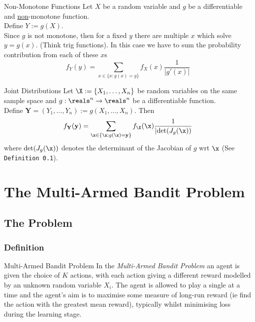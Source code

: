 \documentclass[11pt,a4paper]{article}
\begin{document}
\begin{theorem}{Non-Monotone Functions}
  Let $X$ be a random variable and $g$ be a differentiable and \underline{non}-monotone function.\\
  Define $Y:=g(X)$.\\
  Since $g$ is not monotone, then for a fixed $y$ there are multiple $x$ which solve $y=g(x)$. (Think trig functions). In this case we have to sum the probability contribution from each of these $x$s
  \[ f_Y(y)=\sum_{x\in\{x:g(x)=y\}}f_X(x)\frac{1}{|g'(x)|} \]
\end{theorem}

\begin{theorem}{Joint Distributions}
  Let $\X:=\{X_1,\dots,X_n\}$ be random variables on the same sample space and $g:\reals^n\to\reals^n$ be a differentiable function.\\
  Define $\mathbf{Y}=(Y_1,\dots,Y_n):=g(X_1,\dots,X_n)$. Then
  \[ f_\mathbf{Y}(\mathbf{y})=\sum_{\x\in\{\x:g(\x)=\mathbf{y}\}}f_\X(\x)\frac1{|\text{det}(J_g(\x))} \]
  where $\text{det}(J_g(\x))$ denotes the determinant of the Jacobian of $g$ wrt $\x$ (See \texttt{Definition 0.1}).
\end{theorem}


\section{The Multi-Armed Bandit Problem}

\subsection{The Problem}

  \subsubsection*{Definition}

  \begin{definition}{Multi-Armed Bandit Problem}
    In the \textit{Multi-Armed Bandit Problem} an agent is given the choice of $K$ actions, with each action giving a different reward modelled by an unknown random variable $X_i$. The agent is allowed to play a single at a time and the agent's aim is to maximise some measure of long-run reward (ie find the action with the greatest mean reward), typically whilst minimising loss during the learning stage.
  \end{definition}
\end{document}
